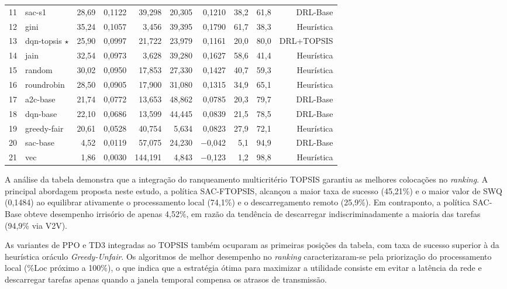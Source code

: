 \begin{table}[htbp]
{{\begin{tabular}{clrrrrrrrr}
11 & sac-s1                      & 28,69 & 0,1122 & 39,298 & 20,305 & 0,1210 & 38,2 & 61,8 & \gls{DRL}-Base \\
12 & gini                        & 35,24 & 0,1057 &  3,456 & 39,395 & 0,1790 & 61,7 & 38,3 & Heurística \\
13 & dqn-topsis $\star$                & 25,90 & 0,0997 & 21,722 & 23,979 & 0,1161 & 20,0 & 80,0 & \gls{DRL}+\gls{TOPSIS} \\
14 & jain                        & 32,54 & 0,0973 &  3,628 & 39,280 & 0,1627 & 58,6 & 41,4 & Heurística \\
15 & random                      & 30,02 & 0,0950 & 17,853 & 27,330 & 0,1427 & 40,7 & 59,3 & Heurística \\
16 & roundrobin                  & 28,50 & 0,0905 & 17,900 & 31,080 & 0,1315 & 34,9 & 65,1 & Heurística \\
17 & a2c-base                    & 21,74 & 0,0772 & 13,653 & 48,862 & 0,0785 & 20,3 & 79,7 & \gls{DRL}-Base \\
18 & dqn-base                    & 22,10 & 0,0686 & 13,599 & 44,445 & 0,0839 & 21,5 & 78,5 & \gls{DRL}-Base \\
19 & greedy-fair                 & 20,61 & 0,0528 & 40,754 &  5,634 & 0,0823 & 27,9 & 72,1 & Heurística \\
20 & sac-base                    &  4,52 & 0,0119 & 57,075 & 24,230 & $-$0,042 &  5,1 & 94,9 & \gls{DRL}-Base \\
21 & vec                         &  1,86 & 0,0030 & 144,191 & 4,843 & $-$0,123 &  1,2 & 98,8 & Heurística \\
\bottomrule
\end{tabular}%
}}
\end{table}

A análise da tabela demonstra que a integração do ranqueamento multicritério \gls{TOPSIS} garantiu as melhores colocações no \textit{ranking}. A principal abordagem proposta neste estudo, a política \gls{SAC}-FTOPSIS, alcançou a maior taxa de sucesso (45{,}21\%) e o maior valor de \gls{SWQ} (0{,}1484) ao equilibrar ativamente o processamento local (74{,}1\%) e o descarregamento remoto (25{,}9\%). Em contraponto, a política \gls{SAC}-Base obteve desempenho irrisório de apenas 4{,}52\%, em razão da tendência de descarregar indiscriminadamente a maioria das tarefas (94{,}9\% via \gls{V2V}).

As variantes de \gls{PPO} e \gls{TD3} integradas ao \gls{TOPSIS} também ocuparam as primeiras posições da tabela, com taxa de sucesso superior à da heurística oráculo \textit{Greedy-Unfair}. Os algoritmos de melhor desempenho no \textit{ranking} caracterizaram-se pela priorização do processamento local (\%Loc próximo a 100\%), o que indica que a estratégia ótima para maximizar a utilidade consiste em evitar a latência da rede e descarregar tarefas apenas quando a janela temporal compensa os atrasos de transmissão.

